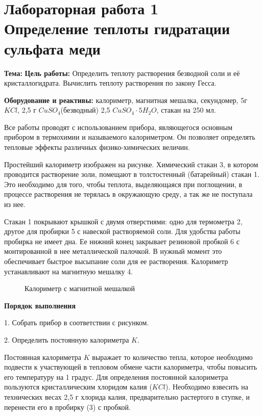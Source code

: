 \section{Лабораторная работа 1 \\ Определение теплоты гидратации сульфата меди}
\textbf{Тема:}
\textbf{Цель работы:}
Определить   теплоту   растворения  безводной соли и её кристаллогидрата. Вычислить теплоту растворения  по закону Гесса.

\textbf{Оборудование и реактивы:} калориметр, магнитная мешалка, секундомер, 5г $KCl$, 2,5 г $CuSO_{4}$(безводный) 2,5 $CuSO_{4}\cdot 5H_{2}O$, стакан на     250 мл.

Все работы  проводят  с  использованием  прибора,   являющегося основным прибором в термохимии и называемого калориметром. Он позволяет определять тепловые эффекты различных физико-химических величин.

Простейший калориметр изображен на рисунке. Химический стакан 3, в котором проводится растворение золи, помещают в толстостенный (батарейный) стакан 1.  Это необходимо  для того, чтобы теплота, выделяющаяся при поглощении, в процессе растворения не терялась в окружающую среду,  а так же не поступала из нее.

Стакан 1 покрывают крышкой с двумя  отверстиями:  одно для термометра 2,  другое для пробирки 5 с навеской растворяемой соли. Для удобства работы пробирка не имеет дна.  Ее нижний конец закрывает  резиновой  пробкой 6 с монтированной в нее металлической палочкой.  В нужный момент это обеспечивает быстрое  высыпание  соли для ее растворения.
Калориметр устанавливают на магнитную мешалку 4.  
\begin{figure}[h]
\caption{Калориметр с магнитной мешалкой}
\label{ris:image}
\end{figure}

\textbf{Порядок выполнения}

1. Собрать прибор в соответствии с рисунком.

2. Определить постоянную калориметра $K$.

Постоянная калориметра $K$ выражает то количество тепла,  которое необходимо подвести к участвующей в  тепловом  обмене  части калориметра, чтобы повысить его температуру на 1 градус. Для определения постоянной калориметра пользуются кристаллическим хлоридом калия ($KCl$). Необходимо взвесить  на технических весах 2,5 г хлорида калия,  предварительно растертого в ступке, и перенести его в пробирку (3) с пробкой.


